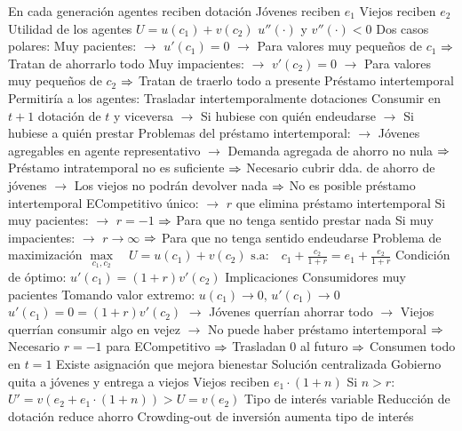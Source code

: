 \documentclass{nuevotema}
\begin{document}
\begin{esquemal}
				\4 En cada generación agentes reciben dotación
				\4 Jóvenes reciben $e_1$
				\4 Viejos reciben $e_2$
			\3 Utilidad de los agentes
				\4 $U = u(c_1) + v(c_2)$
				\4[] $u''(\cdot)$ y $v''(\cdot) < 0$
				\4 Dos casos polares:
				\4[] Muy pacientes:
				\4[] $\to$ $u'(c_1) = 0$
				\4[] $\to$ Para valores muy pequeños de $c_1$
				\4[] $\then$ Tratan de ahorrarlo todo
				\4[] Muy impacientes:
				\4[] $\to$ $v'(c_2) = 0$
				\4[] $\to$ Para valores muy pequeños de $c_2$
				\4[] $\then$ Tratan de traerlo todo a presente
			\3 Préstamo intertemporal
				\4 Permitiría a los agentes:
				\4[] Trasladar intertemporalmente dotaciones
				\4[] Consumir en $t+1$ dotación de $t$ y viceversa
				\4[] $\to$ Si hubiese con quién endeudarse
				\4[] $\to$ Si hubiese a quién prestar
				\4[] Problemas del préstamo intertemporal:
				\4[] $\to$ Jóvenes agregables en agente representativo
				\4[] $\to$ Demanda agregada de ahorro no nula
				\4[] $\then$ Préstamo intratemporal no es suficiente
				\4[] $\then$ Necesario cubrir dda. de ahorro de jóvenes
				\4[] $\to$ Los viejos no podrán devolver nada
				\4[] $\then$ No es posible préstamo intertemporal
				\4[] ECompetitivo único:
				\4[] $\to$ $r$ que elimina préstamo intertemporal
				\4[] Si muy pacientes:
				\4[] $\to$ $r=-1$
				\4[] $\then$ Para que no tenga sentido prestar nada
				\4[] Si muy impacientes:
				\4[] $\to$ $r \to \infty$
				\4[] $\then$ Para que no tenga sentido endeudarse
			\3 Problema de maximización
				\4[] $\underset{c_1, c_2}{\max} \quad U = u(c_1) + v(c_2)$
				\4[] $\text{s.a:} \quad c_1 + \frac{c_2}{1+r} = e_1 + \frac{e_2}{1+r}$
				\4 Condición de óptimo:
				\4[] $u'(c_1) = (1+r) v'(c_2)$
		\2 Implicaciones
			\3 Consumidores muy pacientes
				\4 Tomando valor extremo:
				\4[] $u(c_1) \to 0$, $u'(c_1) \to 0$
				\4[] $u'(c_1) = 0 = (1+r) v'(c_2)$
				\4[] $\to$ Jóvenes querrían ahorrar todo
				\4[] $\to$ Viejos querrían consumir algo en vejez
				\4[] $\to$ No puede haber préstamo intertemporal
				\4[] $\then$ Necesario $r=-1$ para ECompetitivo
				\4[] $\then$ Trasladan 0 al futuro
				\4[] $\then$ Consumen todo en $t=1$
				\4[$\then$] 
				\4[] Existe asignación que mejora bienestar
			\3 Solución centralizada
				\4 Gobierno quita a jóvenes y entrega a viejos
				\4[] Viejos reciben $e_1 \cdot (1+n)$
				\4[] Si $n>r$:
				\4[] $U' = v(e_2 + e_1 \cdot (1+n) ) > U = v(e_2)$
				\4 Tipo de interés variable
				\4[] Reducción de dotación reduce ahorro
				\4[] Crowding-out de inversión aumenta tipo de interés

\end{esquemal}
\end{document}
